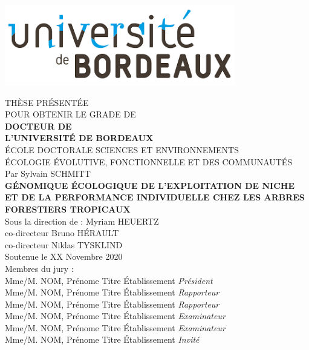 \includegraphics[width=0.3\columnwidth]{images/UB.png}

\begin{center}
  \normalsize{THÈSE PRÉSENTÉE} \\
  \normalsize{POUR OBTENIR LE GRADE DE} \\
  \vspace*{\fill}
  \Large{\textbf{DOCTEUR DE}} \\
  \Large{\textbf{L'UNIVERSITÉ DE BORDEAUX}} \\
  \vspace*{\fill}
  \normalsize{ÉCOLE DOCTORALE SCIENCES ET ENVIRONNEMENTS} \\
  \normalsize{ÉCOLOGIE ÉVOLUTIVE, FONCTIONNELLE ET DES COMMUNAUTÉS} \\
  \vspace*{\fill}
  \normalsize{Par Sylvain SCHMITT} \\
  \vspace*{\fill}
  \Large{\textbf{GÉNOMIQUE ÉCOLOGIQUE DE L'EXPLOITATION DE NICHE ET DE LA PERFORMANCE INDIVIDUELLE CHEZ LES ARBRES FORESTIERS TROPICAUX}} \\
  \vspace*{\fill}
  \normalsize{Sous la direction de : Myriam HEUERTZ} \\
  \normalsize{co-directeur Bruno HÉRAULT} \\
  \normalsize{co-directeur Niklas TYSKLIND} \\
  \vspace*{\fill}
  \normalsize{Soutenue le XX Novembre 2020} \\
  \vspace*{\fill}
  \normalsize{Membres du jury :} \\
  \vspace*{\fill}
  Mme/M. NOM, Prénome Titre Établissement  \emph{Président} \\
  Mme/M. NOM, Prénome Titre Établissement  \emph{Rapporteur} \\
  Mme/M. NOM, Prénome Titre Établissement  \emph{Rapporteur} \\
  Mme/M. NOM, Prénome Titre Établissement  \emph{Examinateur} \\
  Mme/M. NOM, Prénome Titre Établissement  \emph{Examinateur} \\
  Mme/M. NOM, Prénome Titre Établissement  \emph{Invité} \\
\end{center}